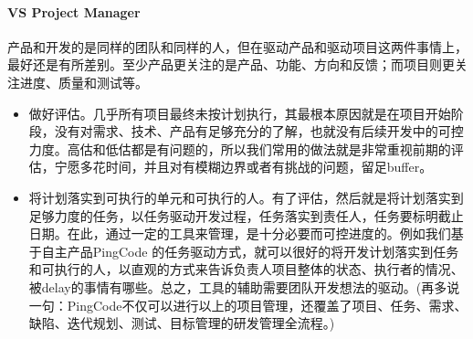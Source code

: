 \documentclass[letterpaper,11pt,english]{sphinxmanual}
\begin{document}
\paragraph{VS Project Manager}
\label{\detokenize{chapter_knowledge/project_manage:vs-project-manager}}
产品和开发的是同样的团队和同样的人，但在驱动产品和驱动项目这两件事情上，最好还是有所差别。至少产品更关注的是产品、功能、方向和反馈；而项目则更关注进度、质量和测试等。
\begin{itemize}
\item {} 
做好评估。几乎所有项目最终未按计划执行，其最根本原因就是在项目开始阶段，没有对需求、技术、产品有足够充分的了解，也就没有后续开发中的可控力度。高估和低估都是有问题的，所以我们常用的做法就是非常重视前期的评估，宁愿多花时间，并且对有模糊边界或者有挑战的问题，留足buffer。

\item {} 
将计划落实到可执行的单元和可执行的人。有了评估，然后就是将计划落实到足够力度的任务，以任务驱动开发过程，任务落实到责任人，任务要标明截止日期。在此，通过一定的工具来管理，是十分必要而可控进度的。例如我们基于自主产品PingCode
的任务驱动方式，就可以很好的将开发计划落实到任务和可执行的人，以直观的方式来告诉负责人项目整体的状态、执行者的情况、被delay的事情有哪些。总之，工具的辅助需要团队开发想法的驱动。(再多说一句：PingCode不仅可以进行以上的项目管理，还覆盖了项目、任务、需求、缺陷、迭代规划、测试、目标管理的研发管理全流程。)

\end{itemize}
\end{document}
